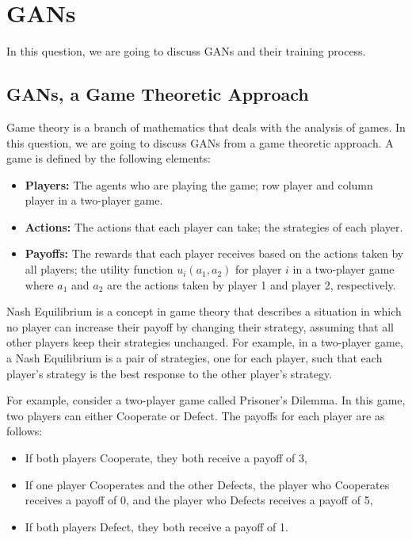 \section{GANs}

In this question, we are going to discuss GANs and their training process.

\subsection{GANs, a Game Theoretic Approach}

Game theory is a branch of mathematics that deals with the analysis of games. In this question, we are going to discuss GANs from a game theoretic approach. A game is defined by the following elements:

\begin{itemize}
    \item \textbf{Players:} The agents who are playing the game; row player and column player in a two-player game.
    \item \textbf{Actions:} The actions that each player can take; the strategies of each player.
    \item \textbf{Payoffs:} The rewards that each player receives based on the actions taken by all players; the utility function $u_i(a_1, a_2)$ for player $i$ in a two-player game where $a_1$ and $a_2$ are the actions taken by player 1 and player 2, respectively.
\end{itemize}

Nash Equilibrium is a concept in game theory that describes a situation in which no player can increase their payoff by changing their strategy, assuming that all other players keep their strategies unchanged. For example, in a two-player game, a Nash Equilibrium is a pair of strategies, one for each player, such that each player’s strategy is the best response to the other player’s strategy.

For example, consider a two-player game called Prisoner’s Dilemma. In this game, two players can either Cooperate or Defect. The payoffs for each player are as follows:
\begin{itemize}
    \item If both players Cooperate, they both receive a payoff of 3,
    \item If one player Cooperates and the other Defects, the player who Cooperates receives a payoff of 0, and the player who Defects receives a payoff of 5,
    \item If both players Defect, they both receive a payoff of 1.
\end{itemize}

